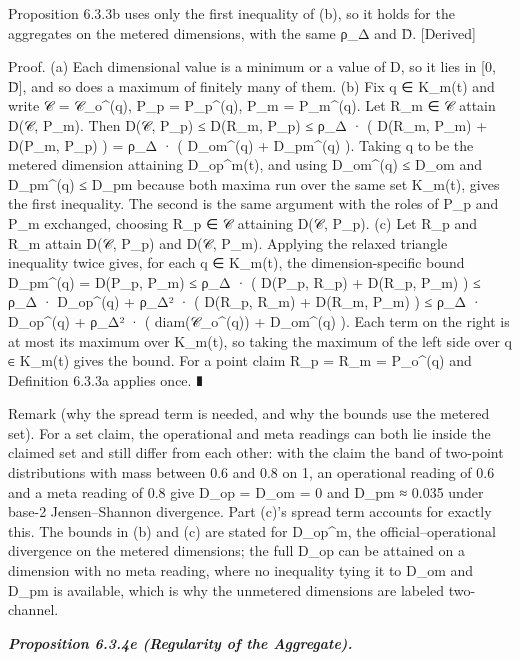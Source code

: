 \documentclass[
]{article}
\begin{document}
Proposition 6.3.3b uses only the first inequality of (b), so it holds
for the aggregates on the metered dimensions, with the same ρ\_Δ and D̄.
{[}Derived{]}

Proof. (a) Each dimensional value is a minimum or a value of D, so it
lies in {[}0, D̄{]}, and so does a maximum of finitely many of them. (b)
Fix q ∈ K\_m(t) and write 𝒞 = 𝒞\_o\^{}(q), P\_p = P\_p\^{}(q), P\_m =
P\_m\^{}(q). Let R\_m ∈ 𝒞 attain D(𝒞, P\_m). Then D(𝒞, P\_p) ≤ D(R\_m,
P\_p) ≤ ρ\_Δ · ( D(R\_m, P\_m) + D(P\_m, P\_p) ) = ρ\_Δ · ( D\_om\^{}(q)
+ D\_pm\^{}(q) ). Taking q to be the metered dimension attaining
D\_op\^{}m(t), and using D\_om\^{}(q) ≤ D\_om and D\_pm\^{}(q) ≤ D\_pm
because both maxima run over the same set K\_m(t), gives the first
inequality. The second is the same argument with the roles of P\_p and
P\_m exchanged, choosing R\_p ∈ 𝒞 attaining D(𝒞, P\_p). (c) Let R\_p and
R\_m attain D(𝒞, P\_p) and D(𝒞, P\_m). Applying the relaxed triangle
inequality twice gives, for each q ∈ K\_m(t), the dimension-specific
bound D\_pm\^{}(q) = D(P\_p, P\_m) ≤ ρ\_Δ · ( D(P\_p, R\_p) + D(R\_p,
P\_m) ) ≤ ρ\_Δ · D\_op\^{}(q) + ρ\_Δ² · ( D(R\_p, R\_m) + D(R\_m, P\_m)
) ≤ ρ\_Δ · D\_op\^{}(q) + ρ\_Δ² · ( diam(𝒞\_o\^{}(q)) + D\_om\^{}(q) ).
Each term on the right is at most its maximum over K\_m(t), so taking
the maximum of the left side over q ∈ K\_m(t) gives the bound. For a
point claim R\_p = R\_m = P\_o\^{}(q) and Definition 6.3.3a applies
once. ∎

Remark (why the spread term is needed, and why the bounds use the
metered set). For a set claim, the operational and meta readings can
both lie inside the claimed set and still differ from each other: with
the claim the band of two-point distributions with mass between 0.6 and
0.8 on 1, an operational reading of 0.6 and a meta reading of 0.8 give
D\_op = D\_om = 0 and D\_pm ≈ 0.035 under base-2 Jensen--Shannon
divergence. Part (c)'s spread term accounts for exactly this. The bounds
in (b) and (c) are stated for D\_op\^{}m, the official--operational
divergence on the metered dimensions; the full D\_op can be attained on
a dimension with no meta reading, where no inequality tying it to D\_om
and D\_pm is available, which is why the unmetered dimensions are
labeled two-channel.

\emph{\textbf{Proposition 6.3.4e (Regularity of the Aggregate).}}
\end{document}
